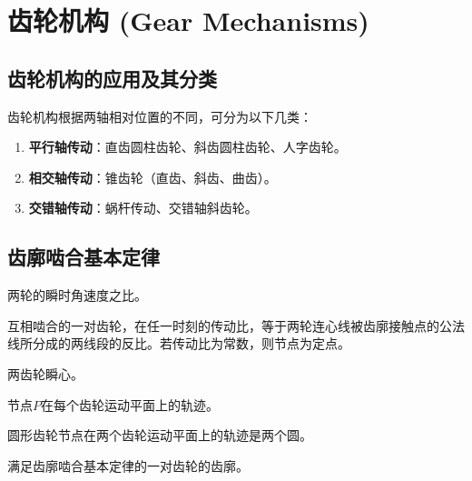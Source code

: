 \chapter{齿轮机构 (Gear Mechanisms)}


\section{齿轮机构的应用及其分类}

齿轮机构根据两轴相对位置的不同，可分为以下几类：

\begin{enumerate}
	\item \textbf{平行轴传动}：直齿圆柱齿轮、斜齿圆柱齿轮、人字齿轮。
	\item \textbf{相交轴传动}：锥齿轮（直齿、斜齿、曲齿）。
	\item \textbf{交错轴传动}：蜗杆传动、交错轴斜齿轮。
\end{enumerate}

\section{齿廓啮合基本定律}

\begin{definition}
	两轮的瞬时角速度之比。
\end{definition}
\begin{definition}[齿廓啮合基本定律]
	互相啮合的一对齿轮，在任一时刻的传动比，等于两轮连心线被齿廓接触点的公法线所分成的两线段的反比。若传动比为常数，则节点为定点。
\end{definition}

\begin{definition}
	两齿轮瞬心。
\end{definition}

\begin{definition}
	节点$P$在每个齿轮运动平面上的轨迹。
\end{definition}

\begin{definition}
	圆形齿轮节点在两个齿轮运动平面上的轨迹是两个圆。
\end{definition}


\begin{definition}
	满足齿廓啮合基本定律的一对齿轮的齿廓。
\end{definition}
